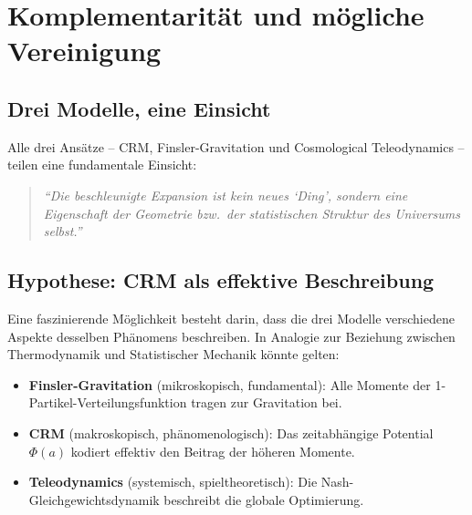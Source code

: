 \documentclass[aps,prd,twocolumn,superscriptaddress,nofootinbib]{revtex4-2}
\begin{document}
\section{Komplementarit\"at und m\"ogliche Vereinigung}
\label{sec:komplementaritaet}

\subsection{Drei Modelle, eine Einsicht}

Alle drei Ans\"atze -- CRM, Finsler-Gravitation und Cosmological Teleodynamics -- teilen eine fundamentale Einsicht:
\begin{quote}
\textit{``Die beschleunigte Expansion ist kein neues `Ding', sondern eine Eigenschaft der Geometrie bzw.\ der statistischen Struktur des Universums selbst.''}
\end{quote}

\subsection{Hypothese: CRM als effektive Beschreibung}

Eine faszinierende M\"oglichkeit besteht darin, dass die drei Modelle verschiedene Aspekte desselben Ph\"anomens beschreiben. In Analogie zur Beziehung zwischen Thermodynamik und Statistischer Mechanik k\"onnte gelten:

\begin{itemize}
\item \textbf{Finsler-Gravitation} (mikroskopisch, fundamental): Alle Momente der 1-Partikel-Verteilungsfunktion tragen zur Gravitation bei.
\item \textbf{CRM} (makroskopisch, ph\"anomenologisch): Das zeitabh\"angige Potential $\Phi(a)$ kodiert effektiv den Beitrag der h\"oheren Momente.
\item \textbf{Teleodynamics} (systemisch, spieltheoretisch): Die Nash-Gleichgewichtsdynamik beschreibt die globale Optimierung.
\end{itemize}
\end{document}
